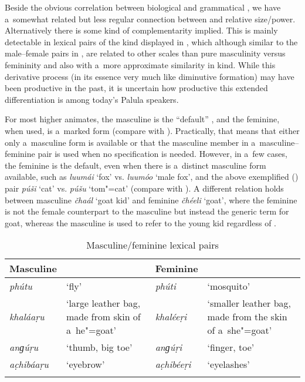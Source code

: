 Beside the obvious correlation between biological and grammatical , we have a~somewhat related but less regular connection between  and relative size/power. Alternatively there is some kind of complementarity implied. This is mainly detectable in lexical pairs of the kind displayed in , which although similar to the male--female pairs in , are related to other scales than pure masculinity versus femininity and also with a~more approximate similarity in kind. While this derivative process (in its essence very much like diminutive formation) may have been productive in the past, it is uncertain how productive this extended  differentiation is among today's Palula speakers.

For most higher animates, the masculine  is the ``default'' , and the feminine, when used, is a~marked form (compare with ). Practically, that means that either only a~masculine form is available or that the masculine member in a~masculine--feminine pair is used when no specification is needed. However, in a~few cases, the feminine is the default, even when there is a~distinct masculine form available, such as \textit{luumái} `fox' vs. \textit{luumóo} `male fox', and the above exemplified () pair \textit{púši} `cat' vs. \textit{púšu} `tom"=cat' (compare with \citealt[103--104]{dahl2000}). A different relation holds between masculine \textit{čhaál} `goat kid' and feminine \textit{čhéeli} `goat', where the feminine  is not the female counterpart to the masculine but instead the generic term for goat, whereas the masculine is used to refer to the young kid regardless of .


\begin{table}[t]
\caption{Masculine/feminine lexical pairs}
\begin{tabularx}{\textwidth}{ l Q l Q }
\lsptoprule
Masculine &
&
Feminine &
\\\midrule
\textit{phútu} &
`fly' &
\textit{phúti} &
`mosquito'\\
\textit{khaláaṛu}
&
`large leather bag, made from skin of a~he"=goat' &
\textit{khaléeṛi}
&
`smaller leather bag, made from the skin of a~she"=goat'\\
\textit{anɡúṛu} &
`thumb, big toe' &
\textit{anɡúṛi} &
`finger, toe'\\
\textit{ac̣hibáaṛu} &
`eyebrow' &
\textit{ac̣hibéeṛi} &
`eyelashes'\\\lspbottomrule
\end{tabularx}
\label{tab:4-2}
\end{table}

